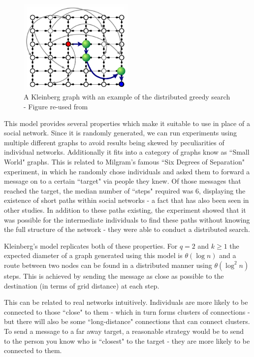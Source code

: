 \documentclass[bsc,frontabs,twoside,singlespacing,parskip,deptreport]{infthesis}     %
\begin{document}
\begin{figure}[ht]
  \centering
    \includegraphics[width=0.5\textwidth]{Schabanel11_Kleinbergs_Network}
  \caption{A Kleinberg graph with an example of the distributed greedy search - Figure re-used from \cite{Schabanel11}}
\end{figure}

This model provides several properties which make it suitable to use in place of a social network. Since it is randomly generated, we can run experiments using multiple different graphs to avoid results being skewed by peculiarities of individual networks. Additionally it fits into a category of graphs know as ``Small World" graphs. This is related to Milgram's famous ``Six Degrees of Separation" experiment\cite{Milgram67,TraversMilgram69}, in which he randomly chose individuals and asked them to forward a message on to a certain ``target" via people they knew. Of those messages that reached the target, the median number of ``steps" required was 6, displaying the existence of short paths within social networks - a fact that has also been seen in other studies\cite{MilgramBackup1,MilgramBackup2}. In addition to these paths existing, the experiment showed that it was possible for the intermediate individuals to find these paths without knowing the full structure of the network - they were able to conduct a distributed search. 

Kleinberg's model replicates both of these properties. For $q = 2$ and $k \ge 1$ the expected diameter of a graph generated using this model is $\theta (\log n)$ and a route between two nodes can be found in a distributed manner using $\theta (\log^{2}n)$ steps\cite{AnalyzingKleinberg}. This is achieved by sending the message as close as possible to the destination (in terms of grid distance) at each step.

This can be related to real networks intuitively. Individuals are more likely to be connected to those ``close" to them - which in turn forms clusters of connections - but there will also be some ``long-distance" connections that can connect clusters. To send a message to a far away target, a reasonable strategy would be to send to the person you know who is ``closest" to the target - they are more likely to be connected to them.
\end{document}
